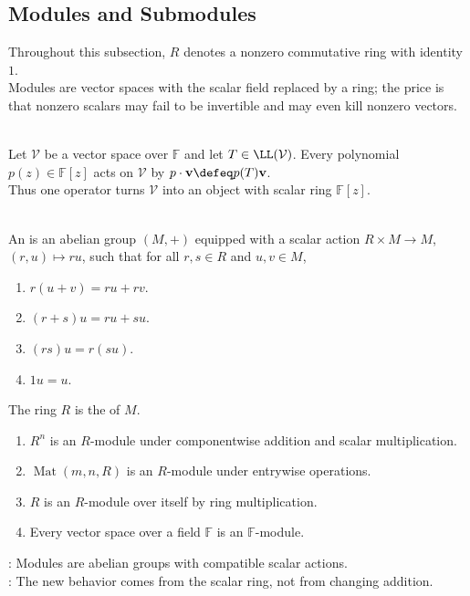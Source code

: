 \subsection{Modules and Submodules}

Throughout this subsection, $R$ denotes a nonzero commutative ring with identity $1$.\\
Modules are vector spaces with the scalar field replaced by a ring; the price is that nonzero scalars may fail to be invertible and may even kill nonzero vectors.

\begin{perspective} \label{per:operator-as-module-motivation} \\
Let $\mathcal{V}$ be a vector space over $\mathbb{F}$ and let $T\in\LL(\mathcal{V})$. Every polynomial $p(z)\in\mathbb{F}[z]$ acts on $\mathcal{V}$ by $p\cdot\mathbf{v}\defeq p(T)\mathbf{v}$.\\
Thus one operator turns $\mathcal{V}$ into an object with scalar ring $\mathbb{F}[z]$.
\end{perspective}

\begin{definition} \label{def:module-over-ring} \\
An  is an abelian group $(M,+)$ equipped with a scalar action
$R\times M\to M$, $(r,u)\mapsto ru$, such that for all $r,s\in R$ and $u,v\in M$,
\begin{enumerate}[label=(\roman*)]
\setlength{\itemsep}{0pt}
\item $r(u+v)=ru+rv$.
\item $(r+s)u=ru+su$.
\item $(rs)u=r(su)$.
\item $1u=u$.
\end{enumerate}
The ring $R$ is the  of $M$.
\end{definition}

\begin{example} \label{ex:basic-module-models} 
\begin{enumerate}[label=(\roman*)]
\setlength{\itemsep}{0pt}
\item $R^n$ is an $R$-module under componentwise addition and scalar multiplication.
\item $\operatorname{Mat}(m,n,R)$ is an $R$-module under entrywise operations.
\item $R$ is an $R$-module over itself by ring multiplication.
\item Every vector space over a field $\mathbb{F}$ is an $\mathbb{F}$-module.
\end{enumerate}
: Modules are abelian groups with compatible scalar actions.\\
: The new behavior comes from the scalar ring, not from changing addition.
\end{example}

